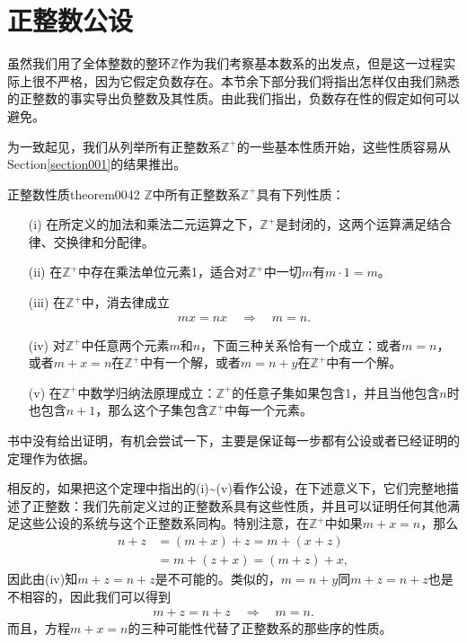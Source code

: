 \section{正整数公设}\label{subsection00205}
虽然我们用了全体整数的整环$\mathbb{Z}$作为我们考察基本数系的出发点，但是这一过程实际上很不严格，因为它假定负数存在。本节余下部分我们将指出怎样仅由我们熟悉的正整数的事实导出负整数及其性质。由此我们指出，负数存在性的假定如何可以避免。

为一致起见，我们从列举所有正整数系$\mathbb{Z}^+$的一些基本性质开始，这些性质容易从Section\ref{section001}的结果推出。
\begin{theorem}{正整数性质}{theorem0042}
$\mathbb{Z}$中所有正整数系$\mathbb{Z}^+$具有下列性质：
\begin{enumerate}
\item[(i)] 在所定义的加法和乘法二元运算之下，$\mathbb{Z}^+$是封闭的，这两个运算满足结合律、交换律和分配律。
\item[(ii)] 在$\mathbb{Z}^+$中存在乘法单位元素1，适合对$\mathbb{Z}^+$中一切$m$有$m \cdot 1 = m$。
\item[(iii)] 在$\mathbb{Z}^+$中，消去律成立
\begin{gather}\label{equation0040}
mx=nx\quad\Rightarrow\quad m=n.
\end{gather}
\item[(iv)] 对$\mathbb{Z}^+$中任意两个元素$m$和$n$，下面三种关系恰有一个成立：或者$m=n$，或者$m+x=n$在$\mathbb{Z}^+$中有一个解，或者$m=n+y$在$\mathbb{Z}^+$中有一个解。
\item[(v)] 在$\mathbb{Z}^+$中数学归纳法原理成立：$\mathbb{Z}^+$的任意子集如果包含1，并且当他包含$n$时也包含$n+1$，那么这个子集包含$\mathbb{Z}^+$中每一个元素。
\end{enumerate}
\end{theorem}

书中没有给出证明，有机会尝试一下，主要是保证每一步都有公设或者已经证明的定理作为依据。

相反的，如果把这个定理中指出的(i)\textasciitilde(v)看作公设，在下述意义下，它们完整地描述了正整数：我们先前定义过的正整数系具有这些性质，并且可以证明任何其他满足这些公设的系统与这个正整数系同构。特别注意，在$\mathbb{Z}^+$中如果$m+x=n$，那么
\[
\begin{aligned}
n+z &= (m+x)+z = m+(x+z)\\
&=m+(z+x) = (m+z)+x,
\end{aligned}
\]
因此由(iv)知$m+z=n+z$是不可能的。类似的，$m=n+y$同$m+z=n+z$也是不相容的，因此我们可以得到
\begin{gather}\label{equation0041}
m+z=n+z \quad \Rightarrow\quad m=n.
\end{gather}
而且，方程$m+x=n$的三种可能性代替了正整数系的那些序的性质。

